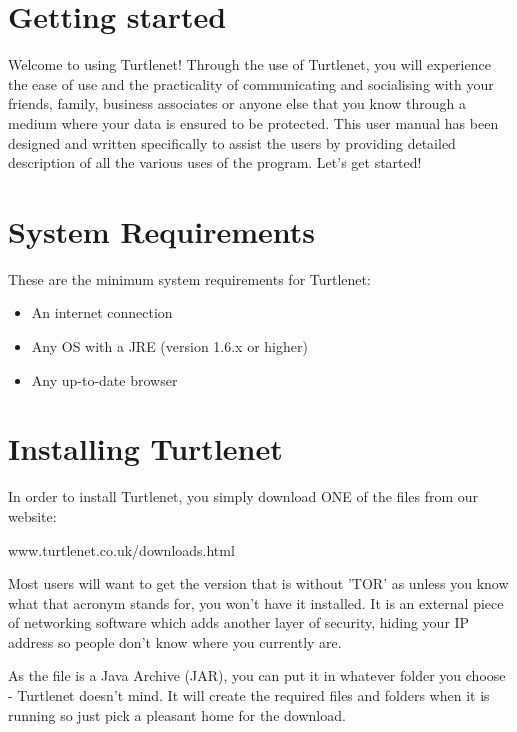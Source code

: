 \section{Getting started}
Welcome to using Turtlenet!  Through the use of Turtlenet, you will experience
the ease of use and the practicality of communicating and socialising with your
friends, family, business associates or anyone else that you know through a
medium where your data is ensured to be protected.  This user manual has been
designed and written specifically to assist the users by providing detailed
description of all the various uses of the program.  Let's get started!

\section{System Requirements}
These are the minimum system requirements for Turtlenet:

\begin{itemize}
\item An internet connection
\item Any OS with a JRE (version 1.6.x or higher)
\item Any up-to-date browser
\end{itemize}

\section{Installing Turtlenet}
In order to install Turtlenet, you simply download ONE of the files from our
website:

www.turtlenet.co.uk/downloads.html

Most users will want to get the version that is without 'TOR' as unless you know
what that acronym stands for, you won't have it installed.  It is an external
piece of networking software which adds another layer of security, hiding your
IP address so people don't know where you currently are.

As the file is a Java Archive (JAR), you can put it in whatever folder you
choose - Turtlenet doesn't mind.  It will create the required files and folders
when it is running so just pick a pleasant home for the download.


